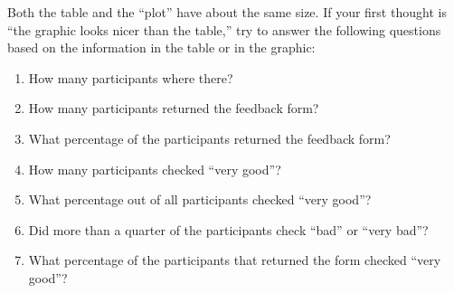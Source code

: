 \bigskip
\par
{}
\bigskip

Both the table and the ``plot'' have about the same size. If your first thought
is ``the graphic looks nicer than the table,'' try to answer the following
questions based on the information in the table or in the graphic:
%
\begin{enumerate}
    \item How many participants where there?
    \item How many participants returned the feedback form?
    \item What percentage of the participants returned the feedback form?
    \item How many participants checked ``very good''?
    \item What percentage out of all participants checked ``very good''?
    \item Did more than a quarter of the participants check ``bad'' or ``very
        bad''?
    \item What percentage of the participants that returned the form checked
        ``very good''?
\end{enumerate}

